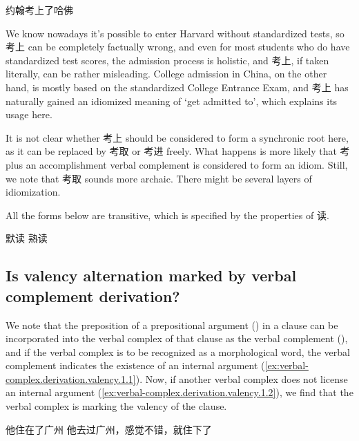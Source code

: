 \documentclass[UTF8, a4paper, oneside, scheme=plain, 12pt]{ctexrep}
\newcommand{\translate}[1]{`#1'}
\begin{document}
\begin{exe}
    \ex 约翰考上了哈佛
\end{exe}

We know nowadays it's possible to enter Harvard without standardized tests,
so 考上 can be completely factually wrong,
and even for most students who do have standardized test scores,
the admission process is holistic, and 考上, if taken literally,
can be rather misleading.
College admission in China, on the other hand, is mostly based on the standardized College Entrance Exam,
and 考上 has naturally gained an idiomized meaning of \translate{get admitted to},
which explains its usage here.

It is not clear whether 考上 should be considered to form a synchronic root here,
as it can be replaced by 考取 or 考进 freely.
What happens is more likely that 考 plus an accomplishment verbal complement is considered to form an idiom.
Still, we note that 考取 sounds more archaic.
There might be several layers of idiomization.

All the forms below are transitive,
which is specified by the properties of 读.

\begin{exe}
    \ex 默读 熟读
\end{exe}

\subsection{Is valency alternation marked by verbal complement derivation?}\label{sec:verbal-complex.derivation.valency}

We note that the preposition of a prepositional argument  
() in a clause
can be incorporated into the verbal complex of that clause
as the verbal complement (),
and if the verbal complex is to be recognized as a morphological word,
the verbal complement indicates the existence of an internal argument
(\ref{ex:verbal-complex.derivation.valency.1.1}).
Now, if another verbal complex does not license an internal argument 
(\ref{ex:verbal-complex.derivation.valency.1.2}),
we find that the verbal complex is marking the valency of the clause.

\begin{exe}
    \ex\label{ex:verbal-complex.derivation.valency.1} \begin{xlist}
        \ex\label{ex:verbal-complex.derivation.valency.1.1} 他住在了广州
        \ex\label{ex:verbal-complex.derivation.valency.1.2} 他去过广州，感觉不错，就住下了
    \end{xlist}
\end{exe}
\end{document}
